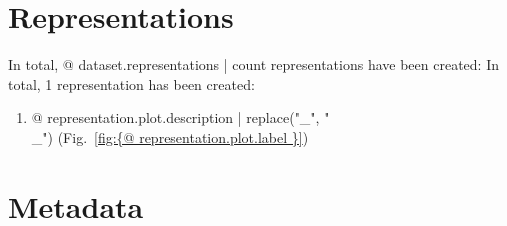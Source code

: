 



\section{Representations}

In total, {@ dataset.representations | count } representations have been created:
In total, 1 representation has been created:

\begin{enumerate}
\item {@ representation.plot.description | replace("_", "\\_") } (Fig.~\ref{fig:{@ representation.plot.label }})
\end{enumerate}




\clearpage


\section{Metadata}




